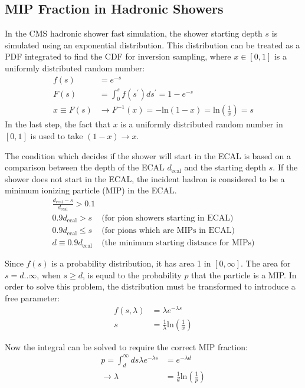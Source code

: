 \subsection{MIP Fraction in Hadronic Showers}

In the CMS hadronic shower fast simulation, the shower starting depth $s$ is simulated using an exponential distribution. This distribution can be treated as a PDF integrated to find the CDF for inversion sampling, where $x \in [0,1]$ is a uniformly distributed random number:
\begin{align}
f(s) &= e^{-s}\\
F(s) &= \int_{0}^{s} f(s^{\prime})ds^{\prime} = 1 - e^{-s}\\
x \equiv F(s) &\rightarrow F^{-1}(x) = -\text{ln}(1-x) = \text{ln}\left(\frac{1}{x}\right) = s
\end{align}
In the last step, the fact that $x$ is a uniformly distributed random number in $[0,1]$ is used to take $(1-x) \rightarrow x$.

The condition which decides if the shower will start in the ECAL is based on a comparison between the depth of the ECAL $d_{\text{ecal}}$ and the starting depth $s$. If the shower does not start in the ECAL, the incident hadron is considered to be a minimum ionizing particle (MIP) in the ECAL.
\begin{align}
\frac{d_{\text{ecal}}-s}{d_{\text{ecal}}} > 0.1 &\\
0.9 d_{\text{ecal}} > s~&\text{(for pion showers starting in ECAL)} \\
0.9 d_{\text{ecal}} \leq s~&\text{(for pions which are MIPs in ECAL)} \\
d \equiv 0.9 d_{\text{ecal}}~&\text{(the minimum starting distance for MIPs)}
\end{align}

Since $f(s)$ is a probability distribution, it has area 1 in $[0,\infty]$. The area for $s = d..\infty$, when $s \geq d$, is equal to the probability $p$ that the particle is a MIP. In order to solve this problem, the distribution must be transformed to introduce a free parameter:
\begin{align}
f(s,\lambda) &= \lambda e^{-\lambda s}\\
s &= \frac{1}{\lambda}\text{ln}\left(\frac{1}{x}\right)
\end{align}

Now the integral can be solved to require the correct MIP fraction:
\begin{align}
p = \int_{d}^{\infty} ds \lambda e^{-\lambda s} &= e^{-\lambda d}\\
\rightarrow \lambda &= \frac{1}{d}\text{ln}\left(\frac{1}{p}\right)
\end{align}

